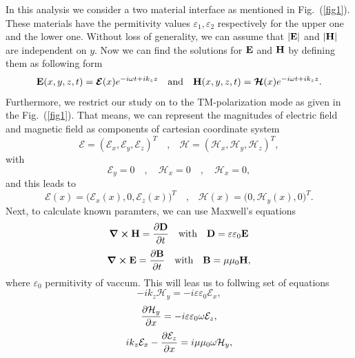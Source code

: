 \documentclass[a4paper]{article}
\numberwithin{equation}{subsection}
\numberwithin{equation}{section}
\begin{document}
In this analysis we consider a two material interface as mentioned in Fig.~(\ref{fig1}). These materials have the permitivity values  $\varepsilon_1,\varepsilon_2$ respectively for the upper one and the lower one. Without loss of generality, we can assume that $|\vb{E}|$ and $|\vb{H}|$ are independent on $y$. Now we can find the solutions for $\vb{E}$ and $\vb{H}$ by defining them as following form
\begin{equation}
  \vb{E} (x,y,z,t) = \bm{\mathcal{E}}(x) e^{-i\omega t + ik_z z}
  \quad \text{and} \quad
  \vb{H} (x,y,z,t) = \bm{\mathcal{H}}(x) e^{-i\omega t + ik_z z}.
\end{equation}
Furthermore, we restrict our study on to the TM-polarization mode as given in the Fig.~(\ref{fig1}). That means, we can represent the magnitudes of electric field and magnetic field as components of cartesian coordinate system
\begin{equation}
  \bm{\mathcal{E}} = (\mathcal{E}_x,\mathcal{E}_y,\mathcal{E}_z)^T
  \quad \text{,} \quad
  \bm{\mathcal{H}} = (\mathcal{H}_x,\mathcal{H}_y,\mathcal{H}_z)^T,
\end{equation}
with
\begin{equation}
  \mathcal{E}_y = 0 \quad,\quad \mathcal{H}_x = 0
  \quad,\quad \mathcal{H}_x = 0,
\end{equation}
and this leads to
\begin{equation}
  \bm{\mathcal{E}}(x) = \Big(\mathcal{E}_x(x),0,\mathcal{E}_z(x)\Big)^T
  \quad \text{,} \quad
  \bm{\mathcal{H}}(x) = \Big(0,\mathcal{H}_y(x),0\Big)^T.
\end{equation}
Next, to calculate known paramters, we can use Maxwell's equations
\begin{equation}
  \curl{\vb{H}} = \pdv{\vb{D}}{t} \quad \text{with} \quad
  \vb{D} = \varepsilon \varepsilon_0 \vb{E}
\end{equation}
\begin{equation}
  \curl{\vb{E}} = \pdv{\vb{B}}{t}\quad \text{with} \quad
  \vb{B} = \mu \mu_0 \vb{H},
\end{equation}
where $\varepsilon_0$ permitivity of vaccum. This will leas us to follwing set of equations
\begin{equation}
  -ik_z \mathcal{H}_y = -i \varepsilon \varepsilon_0 \mathcal{E}_x,
\end{equation}
\begin{equation}
  \pdv{\mathcal{H}_y}{x} = -i \varepsilon \varepsilon_0 \omega \mathcal{E}_z,
\end{equation}
\begin{equation}
  ik_z \mathcal{E}_x - \pdv{\mathcal{E}_z}{x} =
  i \mu \mu_0 \omega \mathcal{H}_y,
\end{equation}
\end{document}
